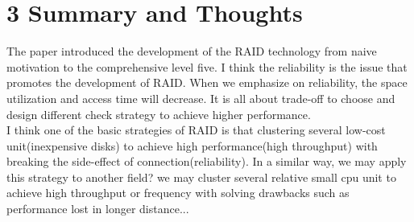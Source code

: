 \documentclass[12pt]{article}
\begin{document}
 \section*{3 Summary and Thoughts}
 The paper introduced the development of the RAID technology from naive motivation to the comprehensive level five. I think the reliability is the issue that promotes the development of RAID. When we emphasize on reliability, the space utilization and access time will decrease. It is all about trade-off to choose and design different check strategy to achieve higher performance. \\[1em]
 I think one of the basic strategies of RAID is that clustering several low-cost unit(inexpensive disks) to achieve high performance(high throughput) with breaking the side-effect of connection(reliability). In a similar way, we may apply this strategy to another field? we may cluster several relative small cpu unit to achieve high throughput or frequency with solving drawbacks such as performance lost in longer distance...
\end{document}
